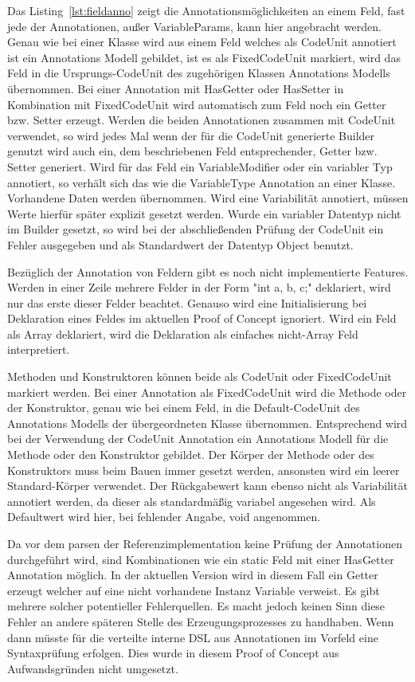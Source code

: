 \documentclass[12pt,oneside,a4paper,parskip]{scrbook}
\begin{document}
Das Listing~\ref{lst:fieldanno} zeigt die Annotationsmöglichkeiten an einem Feld, fast jede der Annotationen, außer VariableParams, kann hier angebracht werden. Genau wie bei einer Klasse wird aus einem Feld welches als CodeUnit annotiert ist ein Annotations Modell gebildet, ist es als FixedCodeUnit markiert, wird das Feld in die Ursprungs-CodeUnit des zugehörigen Klassen Annotations Modells übernommen. Bei einer Annotation mit HasGetter oder HasSetter in Kombination mit FixedCodeUnit wird automatisch zum Feld noch ein Getter bzw. Setter erzeugt. Werden die beiden Annotationen zusammen mit CodeUnit verwendet, so wird jedes Mal wenn der für die CodeUnit generierte Builder genutzt wird auch ein, dem beschriebenen Feld entsprechender, Getter bzw. Setter generiert. Wird für das Feld ein VariableModifier oder ein variabler Typ annotiert, so verhält sich das wie die VariableType Annotation an einer Klasse. Vorhandene Daten werden übernommen. Wird eine Variabilität annotiert, müssen Werte hierfür später explizit gesetzt werden. Wurde ein variabler Datentyp nicht im Builder gesetzt, so wird bei der abschließenden Prüfung der CodeUnit ein Fehler ausgegeben und als Standardwert der Datentyp Object benutzt.

Bezüglich der Annotation von Feldern gibt es noch nicht implementierte Features. Werden in einer Zeile mehrere Felder in der Form "int a, b, c;" deklariert, wird nur das erste dieser Felder beachtet. Genauso wird eine Initialisierung bei Deklaration eines Feldes im aktuellen Proof of Concept ignoriert. Wird ein Feld als Array deklariert, wird die Deklaration als einfaches nicht-Array Feld interpretiert.



Methoden und Konstruktoren können beide als CodeUnit oder FixedCodeUnit markiert werden. Bei einer Annotation als FixedCodeUnit wird die Methode oder der Konstruktor, genau wie bei einem Feld, in die Default-CodeUnit des Annotations Modells der übergeordneten Klasse übernommen. Entsprechend wird bei der Verwendung der CodeUnit Annotation ein Annotations Modell für die Methode oder den Konstruktor gebildet. Der Körper der Methode oder des Konstruktors muss beim Bauen immer gesetzt werden, ansonsten wird ein leerer Standard-Körper verwendet. Der Rückgabewert kann ebenso nicht als Variabilität annotiert werden, da dieser als standardmäßig variabel angesehen wird. Als Defaultwert wird hier, bei fehlender Angabe, void angenommen.

Da vor dem parsen der Referenzimplementation keine Prüfung der Annotationen durchgeführt wird, sind Kombinationen wie ein static Feld mit einer HasGetter Annotation möglich. In der aktuellen Version wird in diesem Fall ein Getter erzeugt welcher auf eine nicht vorhandene Instanz Variable verweist. Es gibt mehrere solcher potentieller Fehlerquellen. Es macht jedoch keinen Sinn diese Fehler an andere späteren Stelle des Erzeugungsprozesses zu handhaben. Wenn dann müsste für die verteilte interne DSL aus Annotationen im Vorfeld eine Syntaxprüfung erfolgen. Dies wurde in diesem Proof of Concept aus Aufwandsgründen nicht umgesetzt.
\end{document}
